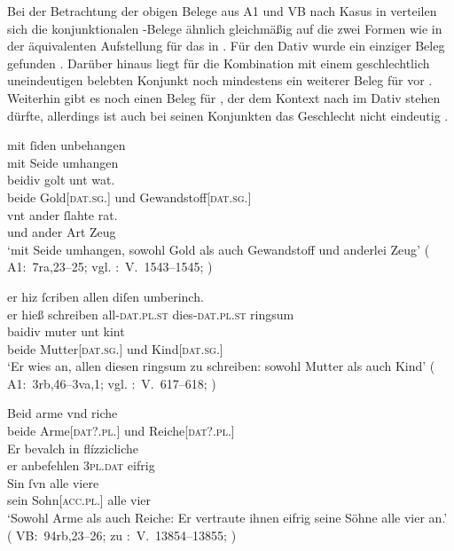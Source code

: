 Bei der Betrachtung der obigen Belege aus A1 und VB nach
Kasus in  verteilen sich die konjunktionalen
-Belege ähnlich gleichmäßig auf die zwei Formen wie in der
äquivalenten Aufstellung für das \CAO{} in
. Für den Dativ wurde ein einziger Beleg gefunden
. Darüber hinaus liegt für die Kombination mit einem
geschlechtlich uneindeutigen belebten Konjunkt noch mindestens ein weiterer
Beleg für  vor . Weiterhin gibt es noch
einen Beleg für , der dem Kontext nach im Dativ stehen dürfte,
allerdings ist auch bei seinen Konjunkten das Geschlecht nicht eindeutig
.

\begin{exe}
\ex \label{ex:datregul}
	\gll mit ſiden unbehangen \\
		mit Seide umhangen \\
\sn \gll beidiv golt unt wat. \\
		beide Gold[\textsc{dat.sg.\NeutI}] und Gewandstoff[\textsc{dat.sg.\FemI}] \\
\sn \gll vnt ander ſlahte rat. \\
		und ander Art Zeug \\
	\trans `mit Seide umhangen, sowohl Gold als auch Gewandstoff und
		anderlei Zeug'
		(%
			A1:~7ra,23--25; vgl.
			\KC:~V.~1543--1545;
			\cite[109]{schroeder1895}%
		)

\ex \label{ex:datextra}
	\begin{xlist}
	\ex \label{ex:datextra_1}
		\gll er hiz ſcriben allen diſen umberinch. \\
			er hieß schreiben all-\textsc{dat.pl.st} dies-\textsc{dat.pl.st} ringsum \\
	\sn \gll baidiv muter unt kint \\
			beide Mutter[\textsc{dat.sg.\FemF}] und Kind[\textsc{dat.sg.\NeutA}] \\
		\trans `Er wies an, allen diesen ringsum zu schreiben: sowohl
			Mutter als auch Kind'
			(%
				A1:~3rb,46--3va,1; vgl.
				\KC:~V.~617--618;
				\cite[92]{schroeder1895}%
			)

	\ex \label{ex:datextra_2}
		\gll Beid arme vnd riche \\
			beide Arme[\textsc{dat?.pl.\MascA}] und Reiche[\textsc{dat?.pl.\MascA}] \\
	\sn \gll Er bevalch in flízzicliche \\
			er anbefehlen \textsc{3pl.dat} eifrig \\
	\sn \gll Sin ſvn alle viere \\
			sein Sohn[\textsc{acc.pl.\MascM}] alle vier \\
		\trans `Sowohl Arme als auch Reiche: Er
			vertraute ihnen eifrig seine Söhne alle vier an.'
			(%
				VB:~94rb,23--26; zu
				\KC:~V.~13854--13855;
				\cite[332]{schroeder1895}%
			)
	\end{xlist}
\end{exe}

